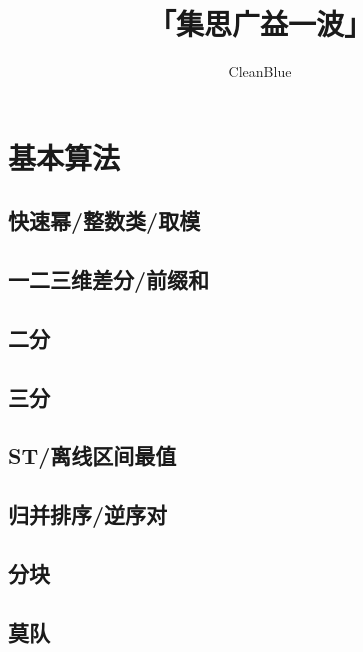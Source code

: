\documentclass[twocolumn,a4]{article}
\title{\CJKfamily{hei} \bfseries 「集思广益一波」}
\author{CleanBlue}
\newcommand{\addcpp}[1]{}
\begin{document}
 \small
\begin{titlepage}
\maketitle
\end{titlepage}

\newpage
\pagestyle{empty}
\renewcommand{\contentsname}{目录}
\tableofcontents
\newpage\clearpage
\newpage
\pagestyle{fancy}
\setcounter{page}{1}   %

\section{基本算法}
	\subsection{快速幂/整数类/取模}
		\addcpp{basic/Z.tex}
	\subsection{一二三维差分/前缀和}
		\addcpp{basic/difference.tex}
	\subsection{二分}
		\addcpp{basic/binary_search.tex}
	\subsection{三分}
		\addcpp{basic/ternary_search.tex}
	\subsection{ST/离线区间最值}
		\addcpp{basic/sparse_table.tex }
	\subsection{归并排序/逆序对}
		\addcpp{basic/merge_sort.tex}
	\subsection{分块}
		\addcpp{basic/block.tex}
	\subsection{莫队}
		\addcpp{basic/mo.tex}
		
\end{document}
